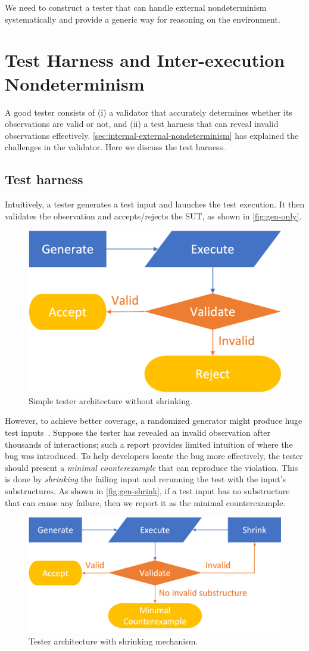 We need to construct a tester that can handle external nondeterminism
systematically and provide a generic way for reasoning on the environment.

\section{Test Harness and Inter-execution Nondeterminism}
\label{sec:inter-execution-nondeterminism}
A good tester consists of (i) a validator that accurately determines whether its
observations are valid or not, and (ii) a test harness that can reveal invalid
observations effectively.  \autoref{sec:internal-external-nondeterminism} has
explained the challenges in the validator.  Here we discuss the test harness.

\subsection{Test harness}
Intuitively, a tester generates a test input and launches the test execution.
It then validates the observation and accepts/rejects the SUT, as shown in
\autoref{fig:gen-only}.
\begin{figure}
  \includegraphics[width=.4\linewidth]{figures/gen-only}
  \caption{Simple tester architecture without shrinking.}
  \label{fig:gen-only}
\end{figure}

However, to achieve better coverage, a randomized generator might produce huge
test inputs~\cite{Hughes2016}.  Suppose the tester has revealed an invalid
observation after thousands of interactions; such a report provides limited
intuition of where the bug was introduced.  To help developers locate the bug
more effectively, the tester should present a {\em minimal counterexample} that
can reproduce the violation.  This is done by {\em shrinking} the failing input
and rerunning the test with the input's substructures.  As shown
in \autoref{fig:gen-shrink}, if a test input has no substructure that can cause
any failure, then we report it as the minimal counterexample.
\begin{figure}
\vspace*{2em}
  \includegraphics[width=.64\linewidth]{figures/gen-shrink}
  \caption{Tester architecture with shrinking mechanism.}
  \label{fig:gen-shrink}
\end{figure}

